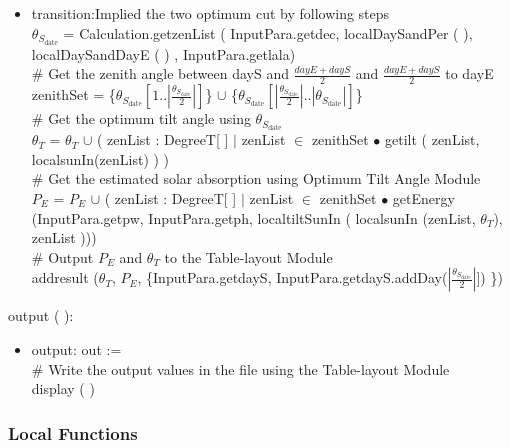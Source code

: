 \documentclass[12pt, titlepage]{article}
\begin{document}
\begin{itemize}
\item transition:Implied the two optimum cut by following steps\\

$\theta_{S_{\text{date}}}$ = Calculation.getzenList ( InputPara.getdec,   localDaySandPer ( ),  localDaySandDayE ( ) , InputPara.getlala)\\

$\#$ Get the zenith angle between dayS and
$\frac{dayE + dayS}{2}$ and $\frac{dayE + dayS}{2}$ to dayE\\
zenithSet =  \{$\theta_{S_{\text{date}}}[1.. | \frac{\theta_{S_{\text{date}}}}{2}|]$\} $\cup$ \{$\theta_{S_{\text{date}}}[| \frac{\theta_{S_{\text{date}}}}{2}|.. | \theta_{S_{\text{date}}}|]$\}\\
 
$\#$ Get the optimum tilt angle using $\theta_{S_{\text{date}}}$\\
$\theta_{T}$ = $\theta_{T}$ $\cup$ ( zenList : DegreeT[ ] $|$ zenList $\in$ zenithSet $\bullet$ getilt ( zenList, localsunIn(zenList) ) )\\

$\#$ Get the estimated solar absorption using Optimum Tilt Angle Module\\

$P_{E}$ = $P_{E}$ $\cup$  ( zenList : DegreeT[ ] $|$ zenList $\in$ zenithSet $\bullet$ getEnergy (InputPara.getpw, InputPara.getph, localtiltSunIn ( localsunIn (zenList, $\theta_{T}$), zenList )))\\

$\#$ Output $P_{E}$ and $\theta_{T}$ to the Table-layout Module\\
addresult ($\theta_{T}$, $P_{E}$, \{InputPara.getdayS, InputPara.getdayS.addDay($| \frac{\theta_{S_{\text{date}}}}{2}|]$) \})\\

\end{itemize}

\noindent  output ( ):
\begin{itemize}
\item output: out :=\\
$\#$ Write the output values in the file using the Table-layout Module\\
display ( )
\end{itemize}
\subsubsection{Local Functions}
\end{document}
